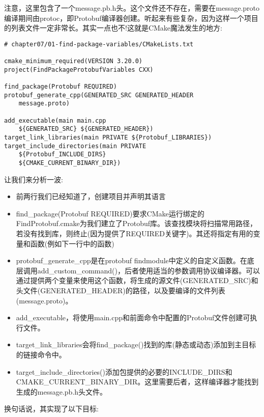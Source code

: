 注意，这里包含了一个message.pb.h头。这个文件还不存在，需要在message.proto编译期间由protoc，即Protobuf编译器创建。听起来有些复杂，因为这样一个项目的列表文件一定非常长。其实一点也不!这就是CMake魔法发生的地方:

\begin{lstlisting}[style=styleCMake]
# chapter07/01-find-package-variables/CMakeLists.txt

cmake_minimum_required(VERSION 3.20.0)
project(FindPackageProtobufVariables CXX)

find_package(Protobuf REQUIRED)
protobuf_generate_cpp(GENERATED_SRC GENERATED_HEADER
	message.proto)

add_executable(main main.cpp
	${GENERATED_SRC} ${GENERATED_HEADER})
target_link_libraries(main PRIVATE ${Protobuf_LIBRARIES})
target_include_directories(main PRIVATE
	${Protobuf_INCLUDE_DIRS}
	${CMAKE_CURRENT_BINARY_DIR})
\end{lstlisting}

让我们来分析一波:

\begin{itemize}
\item 
前两行我们已经知道了，创建项目并声明其语言

\item 
find\_package(Protobuf REQUIRED)要求CMake运行绑定的FindProtobuf.cmake为我们建立了Protobuf库。该查找模块将扫描常用路径，若没有找到库，则终止(因为提供了REQUIRED关键字)。其还将指定有用的变量和函数(例如下一行中的函数)

\item 
protobuf\_generate\_cpp是在protobuf findmodule中定义的自定义函数。在底层调用add\_custom\_command()，后者使用适当的参数调用协议编译器。可以通过提供两个变量来使用这个函数，将生成的源文件(GENERATED\_SRC)和头文件(GENERATED\_HEADER)的路径，以及要编译的文件列表(message.proto)。

\item 
add\_executable，将使用main.cpp和前面命令中配置的Protobuf文件创建可执行文件。

\item 
target\_link\_libraries会将find\_package()找到的库(静态或动态)添加到主目标的链接命令中。

\item 
target\_include\_directories()添加包提供的必要的INCLUDE\_DIRS和CMAKE\_CURRENT\_BINARY\_DIR。这里需要后者，这样编译器才能找到生成的message.pb.h头文件。
\end{itemize}

换句话说，其实现了以下目标:


